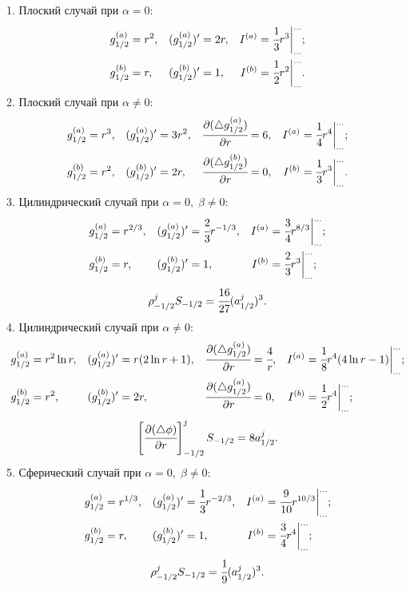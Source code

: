 1. Плоский случай при $\alpha = 0$:
\begingroup
\setlength{\abovedisplayskip}{5pt}
\setlength{\belowdisplayskip}{5pt}
\begin{align*}
	g_{1/2}^{(a)} &= r^2, & (g_{1/2}^{(a)})' &= 2r, & I^{(a)} &= \cfrac{1}{3} r^3 \bigg|_{...}^{...} {\text{;}} \\
	g_{1/2}^{(b)} &= r, & (g_{1/2}^{(b)})' &= 1, & I^{(b)} &= \cfrac{1}{2} r^2 \bigg|_{...}^{...} {\text{.}}
\end{align*}
2. Плоский случай при $\alpha \neq 0$:
\begin{align*}
	g_{1/2}^{(a)} &= r^3, & (g_{1/2}^{(a)})' &= 3r^2, & \cfrac{\partial (\triangle g_{1/2}^{(a)})}{\partial r} &= 6, & I^{(a)} &= \cfrac{1}{4} r^4 \bigg|_{...}^{...} {\text{;}} \\
	g_{1/2}^{(b)} &= r^2, & (g_{1/2}^{(b)})' &= 2r, & \cfrac{\partial (\triangle g_{1/2}^{(b)})}{\partial r} &= 0, & I^{(b)} &= \cfrac{1}{3} r^3 \bigg|_{...}^{...} {\text{.}}
\end{align*}
3. Цилиндрический случай при $\alpha = 0, \; \beta \neq 0$:
\begin{align*}
g_{1/2}^{(a)} &= r^{2/3}, & (g_{1/2}^{(a)})' &= \cfrac{2}{3} r^{-1/3}, & I^{(a)} &= \cfrac{3}{4} r^{8/3} \bigg|_{...}^{...} {\text{;}} \\
g_{1/2}^{(b)} &= r, & (g_{1/2}^{(b)})' &= 1, & I^{(b)} &= \cfrac{2}{3} r^3 \bigg|_{...}^{...} {\text{;}}
\end{align*}
$$\rho_{-1/2}^j S_{-1/2} = \cfrac{16}{27} (a_{1/2}^j)^3 {\text{.}}$$
4. Цилиндрический случай при $\alpha \neq 0$:
\begin{align*}
	g_{1/2}^{(a)} &= r^2 \ln r, & (g_{1/2}^{(a)})' &= r (2 \ln r + 1), & \cfrac{\partial (\triangle g_{1/2}^{(a)})}{\partial r} &= \cfrac{4}{r}, & I^{(a)} &= \cfrac{1}{8} r^4 (4 \ln r - 1) \bigg|_{...}^{...} {\text{;}} \\
	g_{1/2}^{(b)} &= r^2, & (g_{1/2}^{(b)})' &= 2r, & \cfrac{\partial (\triangle g_{1/2}^{(a)})}{\partial r} &= 0, & I^{(b)} &= \cfrac{1}{2} r^4 \bigg|_{...}^{...} {\text{;}}
\end{align*}
$$\left[ \cfrac{\partial (\triangle \phi)}{\partial r} \right]_{-1/2}^j S_{-1/2} = 8 a_{1/2}^j {\text{.}}$$
5. Сферический случай при $\alpha = 0, \; \beta \neq 0$:
\begin{align*}
	g_{1/2}^{(a)} &= r^{1/3}, & (g_{1/2}^{(a)})' &= \cfrac{1}{3} r^{-2/3}, & I^{(a)} &= \cfrac{9}{10} r^{10/3} \bigg|_{...}^{...}  {\text{;}} \\
	g_{1/2}^{(b)} &= r, & (g_{1/2}^{(b)})' &= 1, & I^{(b)} &= \cfrac{3}{4} r^4 \bigg|_{...}^{...} {\text{;}}
\end{align*}
$$\rho_{-1/2}^j S_{-1/2} = \cfrac{1}{9} (a_{1/2}^j)^3 {\text{.}}$$
\endgroup